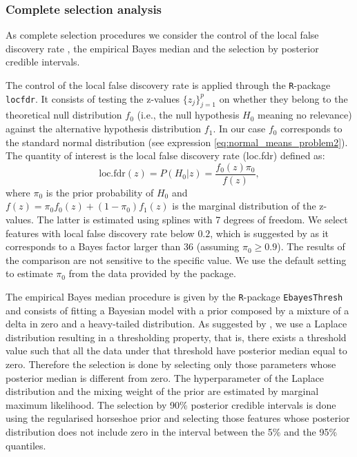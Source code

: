 \documentclass[american,]{article}
\theoremstyle{definition}
\begin{document}
\hypertarget{complete-selection}{%
\subsubsection{Complete selection analysis}\label{complete-selection}}
As complete selection procedures we consider the control of the local
false discovery rate \citep{paper:efron, efron2012large}, the
empirical Bayes median \citep{johnstone2004needles} and the selection
by posterior credible intervals.  \

The control of the local false discovery rate is applied through the
\texttt{R}-package \texttt{locfdr}. It consists of testing the
z-values $\{z_{j}\}_{j=1}^{p}$ on whether they belong to the
theoretical null distribution $f_{0}$ (i.e., the null hypothesis $H_0$
meaning no relevance) against the alternative hypothesis distribution
$f_{1}$. In our case $f_{0}$ corresponds to the standard normal
distribution (see expression \eqref{eq:normal_means_problem2}). The
quantity of interest is the local false discovery rate (loc.fdr)
defined as: \
\begin{equation}
\text{loc.fdr}(z)=P(H_{0}|z)=\frac{f_{0}(z)\pi_{0}}{f(z)},
\end{equation}
where $\pi_{0}$ is the prior probability of $H_0$ and
$f(z)=\pi_{0}f_{0}(z)+(1-\pi_{0})f_{1}(z)$ is the marginal
distribution of the z-values. The latter is estimated using splines
with 7 degrees of freedom. We select features with local false
discovery rate below $0.2$, which is suggested by
\citet{efron2012large} as it corresponds to a Bayes factor larger than
36 (assuming $\pi_{0}\geq0.9$). The results of the comparison are not
sensitive to the specific value. We use the default setting to
estimate $\pi_{0}$ from the data provided by the package.

The empirical Bayes median procedure is given by the
\texttt{R}-package \texttt{EbayesThresh} and consists of fitting a
Bayesian model with a prior composed by a mixture of a delta in zero
and a heavy-tailed distribution. As suggested by
\cite{johnstone2004needles}, we use a Laplace distribution resulting
in a thresholding property, that is, there exists a threshold value
such that all the data under that threshold have posterior median
equal to zero. Therefore the selection is done by selecting only those
parameters whose posterior median is different from zero. The
hyperparameter of the Laplace distribution and the mixing weight of
the prior are estimated by marginal maximum likelihood.  The selection
by 90\% posterior credible intervals is done using the regularised
horseshoe prior and selecting those features whose posterior
distribution does not include zero in the interval between the 5\% and
the 95\% quantiles.
\end{document}
